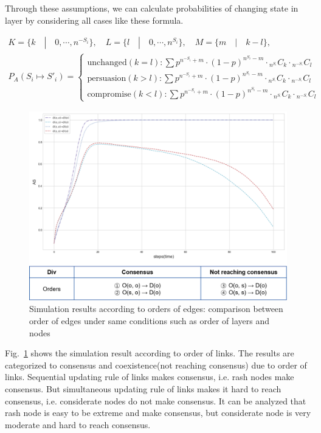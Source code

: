 \documentclass[review]{elsarticle}
\begin{document}
Through these assumptions, we can calculate probabilities of changing state in layer by considering all cases like these formula.  

\begin{equation}
\begin{array}{l}
K = \{ k \quad|\quad 0, \cdots ,{n^{ - {S_i}}}\}, \quad L = \{l \quad|\quad 0, \cdots ,{n^{{S_i}}}\},
\quad M = \{m \quad|\quad k-l\}, \\
{P_A}({S_i} \mapsto {{S'}_i}) = \begin{cases}
\mbox{unchanged}(k = l):\sum {{p^{{n^{ - {S_i}}}+m}} \cdot {{(1 - p)}^{{n^{{S_i}}}-m}} \cdot {}_{{n^{{S_{^i}}}}}{C_k} \cdot {}_{{n^{ - {S_{^i}}}}}{C_l}} \\
\mbox{persuasion}(k > l):\sum {{p^{{n^{ - {S_i}}}+m}} \cdot {{(1 - p)}^{{n^{{S_i}}}-m}} \cdot {}_{{n^{{S_{^i}}}}}{C_k} \cdot {}_{{n^{ - {S_{^i}}}}}{C_l}} \\
\mbox{compromise}(k < l):\sum {{p^{{n^{ - {S_i}}}+m}} \cdot {{(1 - p)}^{{n^{{S_i}}}-m}} \cdot {}_{{n^{{S_{^i}}}}}{C_k} \cdot {}_{{n^{ - {S_{^i}}}}}{C_l}} 
\end{cases}
\end{array}
\end{equation}

\begin{figure}[!htb]
	\centering
	\includegraphics[width=\hsize]{edgeorder.png}
	\caption{Simulation results according to orders of edges: comparison between order of edges under same conditions such as order of layers and nodes}
	\label{edgeorder}
\end{figure}
Fig.~\ref{edgeorder} shows the simulation result according to order of links. The results are categorized to consensus and coexistence(not reaching consensus) due to order of links.
Sequential updating rule of links makes consensus, i.e. rash nodes make consensus. But simultaneous updating rule of links makes it hard to reach consensus, i.e. considerate nodes do not make consensus. It can be analyzed that rash node is easy to be extreme and make consensus, but considerate node is very moderate and hard to reach consensus. 
\end{document}
